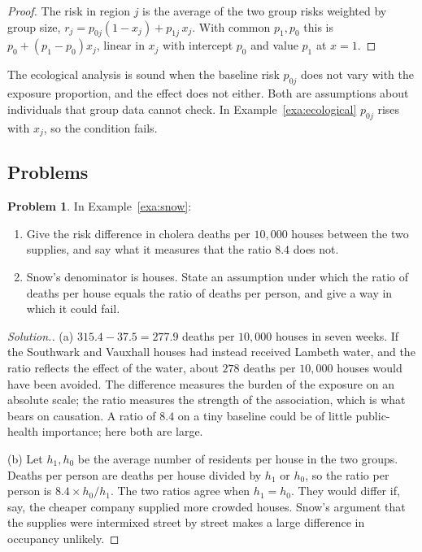 \documentclass[11pt,a4paper]{article}
\numberwithin{equation}{section}
\theoremstyle{definition}
\newtheorem{problemx}{Problem}[subsection]
\newenvironment{problem}{\begin{problemx}}{\end{problemx}}
\newenvironment{solution}
  {\renewcommand{\qedsymbol}{}\begin{proof}[\textit{Solution}.]}
  {\end{proof}}
\begin{document}
\begin{proof}
The risk in region $j$ is the average of the two group risks weighted by group size, $r_j = p_{0j}(1 - x_j) + p_{1j}\,x_j$. With common $p_1, p_0$ this is
$p_0 + (p_1 - p_0)x_j$, linear in $x_j$ with intercept $p_0$ and value $p_1$ at $x = 1$.
\end{proof}

The ecological analysis is sound when the baseline risk $p_{0j}$ does not vary with the exposure proportion, and the effect does not either. Both
are assumptions about individuals that group data cannot check. In Example~\ref{exa:ecological} $p_{0j}$ rises with $x_j$, so the
condition fails.

\subsection{Problems}

\begin{problem}
\label{prob:snow}
In Example~\ref{exa:snow}:
\begin{enumerate}[label=(\alph*)]
\item Give the risk difference in cholera deaths per $10{,}000$ houses between the two supplies, and say what it measures that the
ratio $8.4$ does not.
\item Snow's denominator is houses. State an assumption under which the ratio of deaths per house equals the ratio of deaths per
person, and give a way in which it could fail.
\end{enumerate}
\end{problem}

\begin{solution}
(a) $315.4 - 37.5 = 277.9$ deaths per $10{,}000$ houses in seven weeks. If the Southwark and Vauxhall houses had instead received
Lambeth water, and the ratio reflects the effect of the water, about $278$ deaths per $10{,}000$ houses would have been avoided. The
difference measures the burden of the exposure on an absolute scale; the ratio measures the strength of the association, which is what
bears on causation. A ratio of $8.4$ on a tiny baseline could be of little public-health importance; here both are large.

(b) Let $h_1, h_0$ be the average number of residents per house in the two groups. Deaths per person are deaths per house divided by $h_1$ or
$h_0$, so the ratio per person is $8.4 \times h_0/h_1$. The two ratios agree when $h_1 = h_0$. They would differ if, say, the cheaper company
supplied more crowded houses. Snow's argument that the supplies were intermixed street by street makes a large difference in occupancy
unlikely.
\end{solution}
\end{document}
